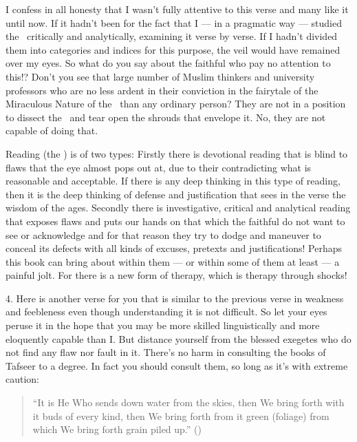 \documentclass[12pt]{memoir}
\begin{document}

I confess in all honesty that I wasn’t fully attentive
to this verse and many like it until now.
If it hadn’t been for the fact that I — in a pragmatic way —
studied the \Quran\ critically and analytically, examining it verse by verse.
If I hadn’t divided them into categories and indices for this purpose,
the veil would have remained over my eyes.
So what do you say about the faithful who pay no attention to this!?
Don’t you see that large number of Muslim thinkers and university professors
who are no less ardent in their conviction in the fairytale
of the Miraculous Nature of the \Quran\ than any ordinary person?
They are not in a position to dissect the \Quran\
and tear open the shrouds that envelope it.
No, they are not capable of doing that.

Reading (the \Quran) is of two types:
Firstly there is devotional reading that is blind to flaws
that the eye almost pops out at,
due to their contradicting what is reasonable and acceptable.
If there is any deep thinking in this type of reading,
then it is the deep thinking of defense and justification
that sees in the verse the wisdom of the ages.
Secondly there is investigative, critical and analytical reading
that exposes flaws and puts our hands on that which the faithful
do not want to see or acknowledge and for that reason they try
to dodge and maneuver to conceal its defects with all kinds of excuses,
pretexts and justifications! Perhaps this book can bring about within them —
or within some of them at least — a painful jolt.
For there is a new form of therapy, which is therapy through shocks!

4. Here is another verse for you that is similar to the previous verse
in weakness and feebleness even though understanding it is not difficult.
So let your eyes peruse it in the hope that you may be more skilled
linguistically and more eloquently capable than I.
But distance yourself from the blessed exegetes
who do not find any flaw nor fault in it.
There’s no harm in consulting the books of Tafseer to a degree.
In fact you should consult them, so long as it’s with extreme caution:

\begin{quote}
“It is He Who sends down water from the skies,
then We bring forth with it buds of every kind,
then We bring forth from it green (foliage)
from which We bring forth grain piled up.”
()
\end{quote}
\end{document}
